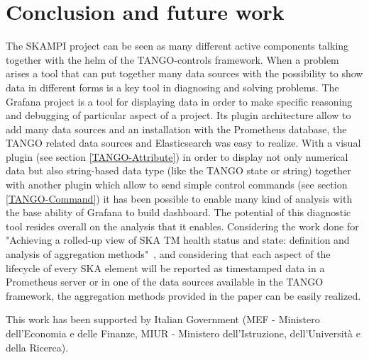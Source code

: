 \documentclass[]{spie}  %
\begin{document}
\section{Conclusion and future work}
The SKAMPI project can be seen as many different active components talking together with the helm of the TANGO-controls framework. When a problem arises a tool that can put together many data sources with the possibility to show data in different forms is a key tool in diagnosing and solving problems. 
The Grafana project is a tool for displaying data in order to make specific reasoning and debugging of particular aspect of a project. Its plugin architecture allow to add many data sources and an installation with the Prometheus database, the TANGO related data sources and Elasticsearch was easy to realize. 
With a visual plugin (see section \ref{TANGO-Attribute}) in order to display not only numerical data but also string-based data type (like the TANGO state or string) together with another plugin which allow to send simple control commands (see section \ref{TANGO-Command}) it has been possible to enable many kind of analysis with the base ability of Grafana to build dashboard. 
The potential of this diagnostic tool resides overall on the analysis that it enables. Considering the work done for "Achieving a rolled-up view of SKA TM health status and state: definition and analysis of aggregation methods"~\cite{10.1117/12.2314056}, and considering that each aspect of the lifecycle of every SKA element will be reported as timestamped data in a Prometheus server or in one of the data sources available in the TANGO framework, the aggregation methods provided in the paper can be easily realized. 

\acknowledgments %
 
This work has been supported by Italian Government (MEF - Ministero dell'Economia e delle Finanze, MIUR - Ministero dell'Istruzione, dell'Università e della Ricerca).

\end{document}
